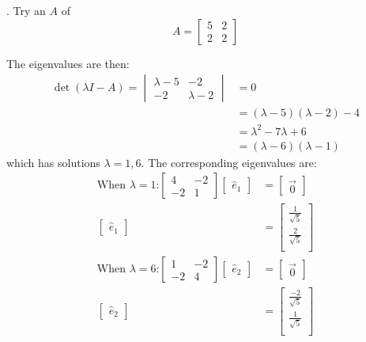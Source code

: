 \documentclass[11pt]{homework}
\begin{document}
.
Try an $A$ of
\begin{equation*}
A = 
  \begin{bmatrix}
  5 & 2 \\
  2 & 2
  \end{bmatrix}
\end{equation*}

The eigenvalues are then:
\begin{align*}
\det(\lambda I -A) = 
  \begin{vmatrix}
  \lambda-5 & -2 \\
  -2 & \lambda-2
  \end{vmatrix}
  &= 0 \\
  &= (\lambda-5)(\lambda-2) -4 \\
  &= \lambda^2 - 7 \lambda +6 \\
  &= (\lambda-6)(\lambda-1)
\end{align*}
which has solutions $\lambda=1,6$.
The corresponding eigenvalues are:
\begin{align*}
\text{When $\lambda = 1$:}
  \begin{bmatrix}
    4 & -2 \\
    -2 & 1
  \end{bmatrix}
  \begin{bmatrix}
    \hat e_1
  \end{bmatrix}
  &=
  \begin{bmatrix}
    \vec 0
  \end{bmatrix} \\
  \begin{bmatrix}
    \hat e_1
  \end{bmatrix}
  &=
  \begin{bmatrix}
    \frac{1}{\sqrt{5}} \\
    \frac{2}{\sqrt{5}} \\
  \end{bmatrix} \\
\text{When $\lambda = 6$:}
  \begin{bmatrix}
    1 & -2 \\
    -2 & 4
  \end{bmatrix}
  \begin{bmatrix}
    \hat e_2
  \end{bmatrix}
  &=
  \begin{bmatrix}
    \vec 0
  \end{bmatrix} \\
  \begin{bmatrix}
    \hat e_2
  \end{bmatrix}
  &=
  \begin{bmatrix}
    \frac{-2}{\sqrt{5}} \\
    \frac{1}{\sqrt{5}} \\
  \end{bmatrix} \\
\end{align*}
\end{document}
